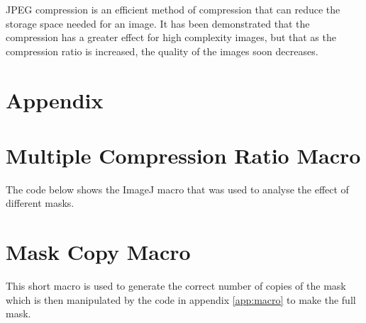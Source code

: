 JPEG compression is an efficient method of compression that can reduce the storage space needed for an image. It has been demonstrated that the compression has a greater effect for high complexity images, but that as the compression ratio is increased, the quality of the images soon decreases.

\section*{Appendix}
\appendix
{}


\section{Multiple Compression Ratio Macro}
The code below shows the ImageJ macro that was used to analyse the effect of different masks.
\label{app:macro}
\scriptsize

\section{Mask Copy Macro}
This short macro is used to generate the correct number of copies of the mask which is then manipulated by the code in appendix \ref{app:macro} to make the full mask.
\label{app:macro2}
\scriptsize

